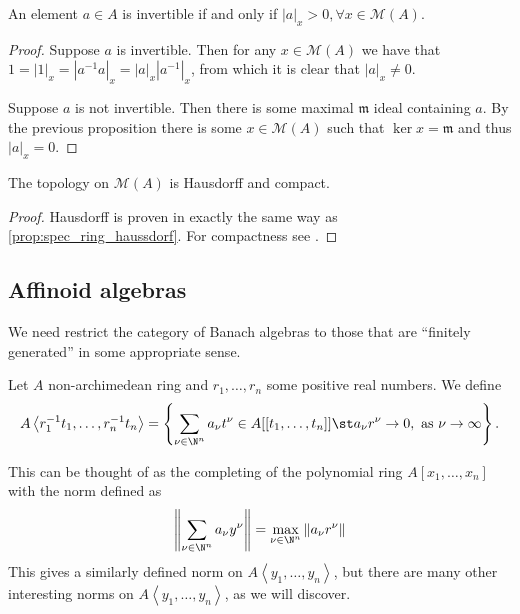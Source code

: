 \begin{corollary}\label{cor:non_vanish_invertible}
	An element $a \in A$ is invertible if and only if $|a|_x > 0, \forall x \in \mathcal{M} (A)$.
\end{corollary}
\begin{proof}
	\ltr
	Suppose $a $ is invertible. Then for any  $x \in \mathcal{M} (A)$ we have that $1 = |1|_x = |a^{-1}a|_x = |a|_x |a^{-1}|_x$, from which it is clear that $|a|_x \ne 0$. 

	\rtl Suppose $a$ is not invertible. Then there is some maximal $\mathfrak{m}  $ ideal containing $a$. 
	By the previous proposition there is some $x \in \mathcal{M} (A)$ such that $\ker x = \mathfrak{m} $ and thus $|a|_x = 0$. 
\end{proof}

\begin{proposition}
	The topology on $\mathcal{M} (A)$ is Hausdorff and compact. 
\end{proposition}
\begin{proof}
	Hausdorff is proven in exactly the same way as \cref{prop:spec_ring_haussdorf}.
	For compactness see \cite[][thm.\ 1.2.1]{berkovichSpectralTheoryAnalytic2012}.
\end{proof}
\subsection{Affinoid algebras} \label{sec:affinoid_algebras}
We need restrict the category of Banach algebras to those that are ``finitely generated'' in some appropriate sense. 

\begin{definition}
	Let $A$ non-archimedean ring and $r_1, \ldots, r_n$ some positive real numbers. We define \[
		A \left<r_1^{-1}t_1, \ldots, r_{n}^{-1} t_n \right> = \left\{\sum_{\nu \in \N^{n}}^{} a_\nu t^{\nu} \in A[[t_1,\ldots, t_n]]\st a_\nu r^{\nu} \to 0, \text{ as } \nu \to \infty\right\} 
	.\] 
\end{definition}
This can be thought of as the completing of the polynomial ring $A[x_1, \ldots, x_n]$ with the norm defined as 
\begin{equation}\label{eq:norm_tate}
	\left\| \sum_{\nu \in \N^{n}} a_\nu y^{\nu}\right\| = \max_{\nu \in \N^{n}} \|a_\nu r^{\nu}\|
\end{equation}
This gives a similarly defined norm on $A\left<y_1, \ldots, y_n \right>$, but there are many other interesting norms on $A \left<y_1, \ldots, y_n \right>$, as we will discover. 



